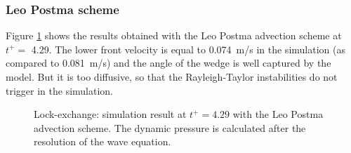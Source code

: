 \subsubsection{Leo Postma scheme}
Figure \ref{fig:lock-exchange_dp_no_LP} shows the results obtained with the Leo
Postma advection scheme at $t^+=$ 4.29.
The lower front velocity is equal to 0.074~m/s in the simulation (as compared
to 0.081~m/s) and the angle of the wedge
is well captured by the model. But it is too diffusive, so that the
Rayleigh-Taylor instabilities do not trigger in the simulation.
\begin{figure}[ht]
  \begin{center}
    \caption{Lock-exchange: simulation result at $t^+=4.29$ with the Leo Postma advection scheme.
      The dynamic pressure is calculated after the resolution of the wave equation.}
    \label{fig:lock-exchange_dp_no_LP}
  \end{center}
\end{figure}

